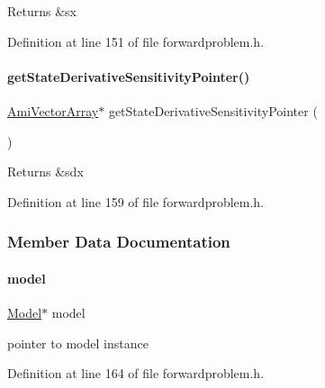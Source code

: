 \begin{DoxyReturn}{Returns}
\&sx 
\end{DoxyReturn}


Definition at line 151 of file forwardproblem.\+h.

\mbox{\label{classamici_1_1_forward_problem_a440eebbd8bf6a343ff7ee80ddc39b0a0}} 
\paragraph{\texorpdfstring{getStateDerivativeSensitivityPointer()}{getStateDerivativeSensitivityPointer()}}
{\footnotesize\ttfamily \mbox{\hyperlink{classamici_1_1_ami_vector_array}{Ami\+Vector\+Array}}$\ast$ get\+State\+Derivative\+Sensitivity\+Pointer (\begin{DoxyParamCaption}{ }\end{DoxyParamCaption})}

\begin{DoxyReturn}{Returns}
\&sdx 
\end{DoxyReturn}


Definition at line 159 of file forwardproblem.\+h.



\subsubsection{Member Data Documentation}
\mbox{\label{classamici_1_1_forward_problem_a7b56c3ca57dde73bdbc8dbe9772bca19}} 
\paragraph{\texorpdfstring{model}{model}}
{\footnotesize\ttfamily \mbox{\hyperlink{classamici_1_1_model}{Model}}$\ast$ model}

pointer to model instance 

Definition at line 164 of file forwardproblem.\+h.

\mbox{\label{classamici_1_1_forward_problem_a4c0807651f0594a186e8856f22e442cc}} 
